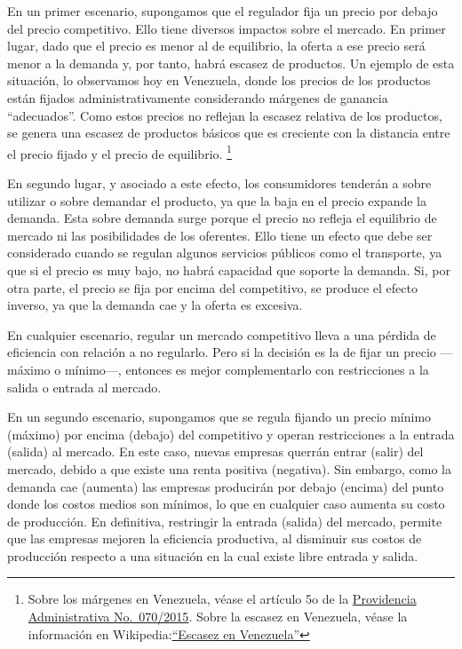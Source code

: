 \documentclass[
  12pt,
  spanish,
]{book}
\begin{document}
En un primer escenario, supongamos que el regulador fija un precio por debajo del precio competitivo. Ello tiene diversos impactos sobre el mercado. En primer lugar, dado que el precio es menor al de equilibrio, la oferta a ese precio será menor a la demanda y, por tanto, habrá escasez de productos. Un ejemplo de esta situación, lo observamos hoy en Venezuela, donde los precios de los productos están fijados administrativamente considerando márgenes de ganancia ``adecuados''. Como estos precios no reflejan la escasez relativa de los productos, se genera una escasez de productos básicos que es creciente con la distancia entre el precio fijado y el precio de equilibrio.
\footnote{Sobre los márgenes en Venezuela, véase el artículo 5o de la \href{http://www.superintendenciadepreciosjustos.gob.ve/sites/default/files/PROVIDENCIA\%20070-2015.pdf}{Providencia Administrativa No.~070/2015}. Sobre la escasez en Venezuela, véase la información en Wikipedia:\href{https://es.wikipedia.org/wiki/Escasez_en_Venezuela}{``Escasez en Venezuela''}}

En segundo lugar, y asociado a este efecto, los consumidores tenderán a sobre utilizar o sobre demandar el producto, ya que la baja en el precio expande la demanda. Esta sobre demanda surge porque el precio no refleja el equilibrio de mercado ni las posibilidades de los oferentes. Ello tiene un efecto que debe ser considerado cuando se regulan algunos servicios públicos como el transporte, ya que si el precio es muy bajo, no habrá capacidad que soporte la demanda. Si, por otra parte, el precio se fija por encima del competitivo, se produce el efecto inverso, ya que la demanda cae y la oferta es excesiva.

En cualquier escenario, regular un mercado competitivo lleva a una pérdida de eficiencia con relación a no regularlo. Pero si la decisión es la de fijar un precio ---máximo o mínimo---, entonces es mejor complementarlo con restricciones a la salida o entrada al mercado.

En un segundo escenario, supongamos que se regula fijando un precio mínimo (máximo) por encima (debajo) del competitivo y operan restricciones a la entrada (salida) al mercado. En este caso, nuevas empresas querrán entrar (salir) del mercado, debido a que existe una renta positiva (negativa). Sin embargo, como la demanda cae (aumenta) las empresas producirán por debajo (encima) del punto donde los costos medios son mínimos, lo que en cualquier caso aumenta su costo de producción. En definitiva, restringir la entrada (salida) del mercado, permite que las empresas mejoren la eficiencia productiva, al disminuir sus costos de producción respecto a una situación en la cual existe libre entrada y salida.
\end{document}
